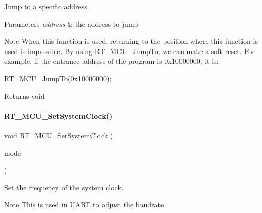 Jump to a specific address. 


\begin{DoxyParams}{Parameters}
{\em address} & the address to jump \\
\hline
\end{DoxyParams}
\begin{DoxyNote}{Note}
When this function is used, returning to the position where this function is used is impossible. By using R\+T\+\_\+\+M\+C\+U\+\_\+\+Jump\+To, we can make a soft reset. For example, if the entrance address of the program is 0x10000000, it is\+: 
\begin{DoxyCode}
\mbox{\hyperlink{a00020_a81b750927e5dc24f1595c15e7dd7bdf5}{RT\_MCU\_JumpTo}}(0x10000000);
\end{DoxyCode}
 
\end{DoxyNote}
\begin{DoxyReturn}{Returns}
void 
\end{DoxyReturn}
\mbox{\label{a00020_a8e87aa8d85986723da69a68cd0d1e51c}} 
\paragraph{\texorpdfstring{R\+T\+\_\+\+M\+C\+U\+\_\+\+Set\+System\+Clock()}{RT\_MCU\_SetSystemClock()}}
{\footnotesize\ttfamily void R\+T\+\_\+\+M\+C\+U\+\_\+\+Set\+System\+Clock (\begin{DoxyParamCaption}\item[{\mbox{\hyperlink{a00020_ae3a2d501b8662e11b969fb4a5e195e5b}{S\+Y\+S\+\_\+\+C\+LK}}}]{mode }\end{DoxyParamCaption})\hspace{0.3cm}{\ttfamily [inline]}}



Set the frequency of the system clock. 

\begin{DoxyNote}{Note}
This is used in U\+A\+RT to adjust the baudrate. 
\end{DoxyNote}

